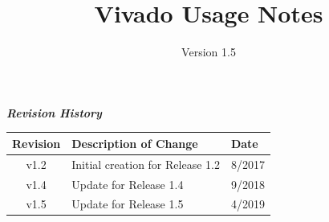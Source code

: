 \def\docTitle{Vivado Usage Notes}
\def\docVersion{1.5}

\date{Version \docVersion} %
\title{\docTitle}
\lhead{\small{\docTitle}}
\usepackage{enumitem}

\maketitle
\thispagestyle{fancy}
\newpage
\begin{center}
  \textit{\textbf{Revision History}}
  \begin{table}[H]
    \begin{tabularx}{\textwidth}{|c|X|l|}
      \hline
      \rowcolor{blue}
      \textbf{Revision} & \textbf{Description of Change} & \textbf{Date} \\
      \hline
      v1.2 & Initial creation for Release 1.2 & 8/2017 \\
      \hline
      v1.4 & Update for Release 1.4 & 9/2018 \\
      \hline
      v1.5 & Update for Release 1.5 & 4/2019 \\
      \hline
    \end{tabularx}
  \end{table}

\end{center}
\newpage

